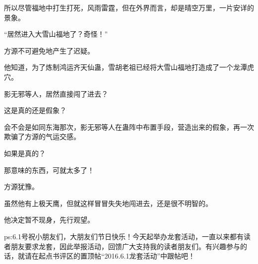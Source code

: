 \begin{this_body}
所以尽管福地中打生打死，风雨雷霆，但在外界而言，却是晴空万里，一片安详的景象。

“居然进入大雪山福地了？奇怪！”

方源不可避免地产生了迟疑。

他知道，为了炼制鸿运齐天仙蛊，雪胡老祖已经将大雪山福地打造成了一个龙潭虎穴。

影无邪等人，居然直接闯了进去？

这是真的还是假象？

会不会是如同东海那次，影无邪等人在蛊阵中布置手段，营造出来的假象，再一次欺骗了方源的气运交感。

如果是真的？

那意味的东西，可就太多了！

方源犹豫。

虽然他有上极天鹰，但就这样冒冒失失地闯进去，还是很不明智的。

他决定暂不现身，先行观望。

ps:6.1号祝小朋友们，大朋友们节日快乐！今天起举办龙套活动，一直以来都有读者朋友要求龙套，因此举报活动，回馈广大支持我的读者朋友们。有兴趣参与的话，就请在起点书评区的置顶帖“2016.6.1龙套活动”中跟帖吧！

\end{this_body}

